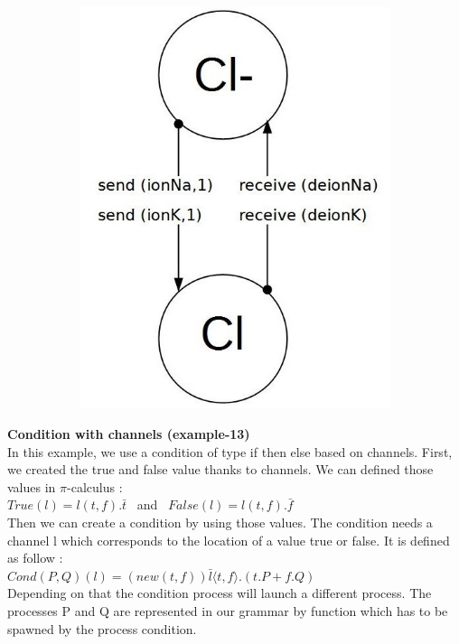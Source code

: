 \documentclass[11pt]{report}
\begin{document}
\begin{figure}[!h]
\begin{subfigure}[b]{0.3\textwidth}
        \includegraphics[width=\textwidth]{Cl.jpg}
    \end{subfigure}
\end{figure}

\tabto{0cm} {\Large \textbf{Condition with channels (example-13)}}
\vspace*{3pt}
\\
In this example, we use a condition of type if then else based on channels. First, we created the true and false value thanks to channels. We can defined those values in $\pi$-calculus : \\
$True(l) = l(t,f). \bar{t}$ \ and \ $False(l) = l(t,f). \bar{f}$
\\ Then we can create a condition by using those values.
The condition needs a channel l which corresponds to the location of a value true or false. It is defined as follow : \\
$ Cond(P,Q)(l) = (new (t,f)) \bar{l} \langle t,f \rangle .(t.P + f.Q)$
\\Depending on that the condition process will launch a different process. The processes P and Q are represented in our grammar by function which has to be spawned by the process condition. 
\newpage
\end{document}
